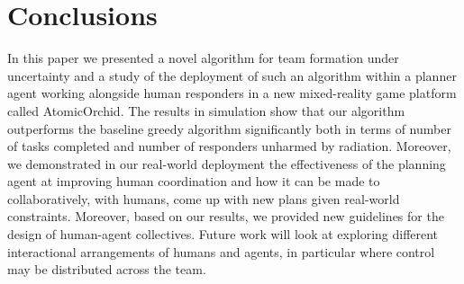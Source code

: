 \section{Conclusions}\label{sec:conclusions}
\noindent In this paper we presented a novel algorithm for team formation under uncertainty and a study of the deployment of such an algorithm within a planner agent working alongside human responders in a new mixed-reality game platform called AtomicOrchid. The results in simulation show that our algorithm outperforms the baseline greedy algorithm significantly both in terms of number of tasks completed and number of responders unharmed by radiation. Moreover, we demonstrated in our real-world deployment the effectiveness of the planning agent at improving human coordination and how it can be made to collaboratively, with humans, come up with new plans given real-world constraints. Moreover, based on our results, we provided new guidelines for the design of human-agent collectives. Future work will look at exploring different interactional arrangements of humans and agents, in particular where control may be distributed across the team.